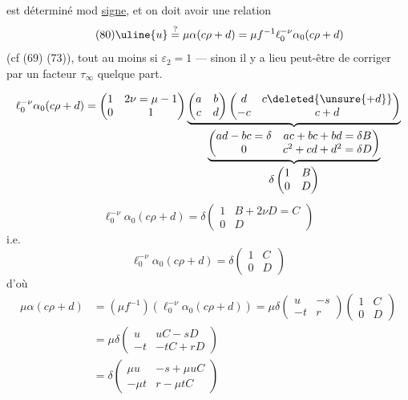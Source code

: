 
est déterminé mod \uline{signe}, et 
on doit avoir une relation
\[
\tag{80}
\uline{u}\overset{?}{=}\mu\alpha(c\rho+d)
=\mu f^{-1}\ell_0^{-\nu}\alpha_0(c\rho+d)
\]
(cf (69) (73)), tout au moins si $\varepsilon_2=1$ ---
sinon il y a lieu peut-être de corriger par un facteur $\tau_\infty$ quelque part.


\[
\ell_0^{-\nu}\alpha_0(c\rho+d)
=
\begin{pmatrix}1&2\nu=\mu-1\\0&1\end{pmatrix}
\underbrace{
\begin{pmatrix}a&b\\c&d\end{pmatrix}
\begin{pmatrix}d&c\deleted{\unsure{+d}}\\-c&c+d\end{pmatrix}
}_{\displaystyle
\underbrace{
\begin{pmatrix}
ad-bc=\delta&ac+bc+bd=\delta B\\
0&c^2+cd+d^2=\delta D
\end{pmatrix}
}_{\displaystyle\delta\begin{pmatrix}1&B\\0&D\end{pmatrix}}
}
\]
\[
\ell_0^{-\nu}\alpha_0(c\rho+d)
=\delta\begin{pmatrix}1&B+2\nu D=C\\0&D\end{pmatrix}
\]
i.e.
\[
\tag{81}
\ell_0^{-\nu}\alpha_0(c\rho+d)
=\delta\begin{pmatrix}1&C\\0&D\end{pmatrix}
\]
d'où
\[
\begin{aligned}
\mu\alpha(c\rho+d)
&=(\mu f^{-1})(\ell_0^{-\nu}\alpha_0(c\rho+d))
=\mu\delta\begin{pmatrix}u&-s\\-t&r\end{pmatrix}
\begin{pmatrix}1&C\\0&D\end{pmatrix}\\
&=\mu\delta\begin{pmatrix}u&uC-sD\\-t&-tC+rD\end{pmatrix}\\
&=\delta\begin{pmatrix}\mu u&-s+\mu uC\\-\mu t&r-\mu tC\end{pmatrix}
\end{aligned}
\]
